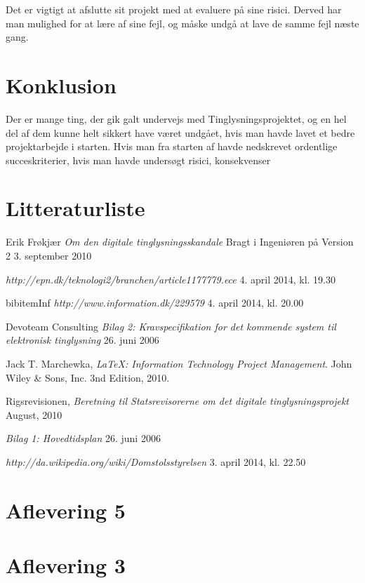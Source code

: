 \documentclass[10pt,a4paper,danish]{article}
\begin{document}
Det er vigtigt at afslutte sit projekt med at evaluere på sine risici. Derved har man mulighed for at lære af sine fejl, og måske undgå at lave de samme fejl næste gang.


\section{Konklusion}
Der er mange ting, der gik galt undervejs med Tinglysningsprojektet, og en hel del af dem kunne helt sikkert have været undgået, hvis man havde lavet et bedre projektarbejde i starten. Hvis man fra starten af havde nedskrevet ordentlige succeskriterier, hvis man havde undersøgt risici, konsekvenser


\section{Litteraturliste}
\begin{thebibliography}{9}

  Erik Frøkjær
  \emph{Om den digitale tinglysningsskandale}
  Bragt i Ingeniøren på Version 2
  3. september 2010

  \emph{http://epn.dk/teknologi2/branchen/article1177779.ece}
  4. april 2014, kl. 19.30

bibitem{Inf}
  \emph{http://www.information.dk/229579}
  4. april 2014, kl. 20.00

  Devoteam Consulting
  \emph{Bilag 2: Kravspecifikation for det kommende
  system til elektronisk tinglysning}
  26. juni 2006

  Jack T. Marchewka,
  \emph{\LaTeX: Information Technology Project Management}.
  John Wiley \& Sons, Inc.
  3nd Edition,
  2010.

  Rigsrevisionen,
  \emph{Beretning til Statsrevisorerne om det digitale   
  tinglysningsprojekt}
  August, 2010

  \emph{Bilag 1: Hovedtidsplan}
  26. juni 2006

  \emph{http://da.wikipedia.org/wiki/Domstolsstyrelsen}
  3. april 2014, kl. 22.50

\end{thebibliography}

\newpage
\appendix
\section{Aflevering 5}
   \label{app:vandfald}


\section{Aflevering 3}
\label{app:uge3}

\end{document}
